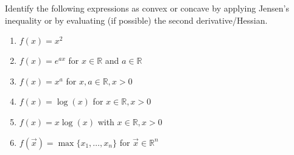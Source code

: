 
\begin{exercise}[subtitle={Paper}]
  Identify the following expressions as convex or concave by applying Jensen's inequality or by evaluating (if possible) the second derivative/Hessian.
  \begin{enumerate}[label=\emph{\alph*)}]
  \item $f(x) = x^2$
  \item $f(x) = e^{ax}$ for $x\in \mathbb{R}$ and $a \in \mathbb{R}$
  \item $f(x) = x^a$ for $x, a\in \mathbb{R}, x> 0$
  \item $f(x) = \log(x)$ for $x\in \mathbb{R}, x>0$
  \item $f(x) = x \log(x)$ with $x\in \mathbb{R}, x> 0$
  \item $f(\vec{x}) = \max\{x_1, \dots , x_n\}$ for $\vec{x}\in \mathbb{R}^n$
  \end{enumerate}
\end{exercise}

